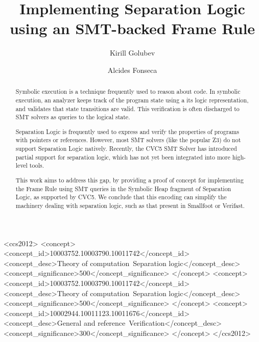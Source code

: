 \documentclass[sigplan,screen,review]{acmart}
\begin{document}
\title[Implementing Separation Logic using an SMT-backed Frame Rule]{Implementing Separation Logic \\ using an SMT-backed Frame Rule}

\author{Kirill Golubev}

\author{Alcides Fonseca}

\begin{abstract}

Symbolic execution is a technique frequently used to reason about code. In symbolic execution, an analyzer keeps track of the program state using a its logic representation, and validates that state transitions are valid. This verification is often discharged to SMT solvers as queries to the logical state.

Separation Logic is frequently used to express and verify the properties of programs with pointers or references. However, most SMT solvers (like the popular Z3) do not support Separation Logic natively. Recently, the CVC5 SMT Solver has introduced partial support for separation logic, which has not yet been integrated into more high-level tools.

This work aims to address this gap, by providing a proof of concept for implementing the Frame Rule using SMT queries in the Symbolic Heap fragment of Separation Logic, as supported by CVC5. We conclude that this encoding can simplify the machinery dealing with separation logic, such as that present in Smallfoot or Verifast.

\end{abstract}

\begin{CCSXML}
<ccs2012>
<concept>
<concept_id>10003752.10003790.10011742</concept_id>
<concept_desc>Theory of computation~Separation logic</concept_desc>
<concept_significance>500</concept_significance>
</concept>
<concept>
<concept_id>10003752.10003790.10011742</concept_id>
<concept_desc>Theory of computation~Separation logic</concept_desc>
<concept_significance>500</concept_significance>
</concept>
<concept>
<concept_id>10002944.10011123.10011676</concept_id>
<concept_desc>General and reference~Verification</concept_desc>
<concept_significance>300</concept_significance>
</concept>
</ccs2012>
\end{CCSXML}
\end{document}
